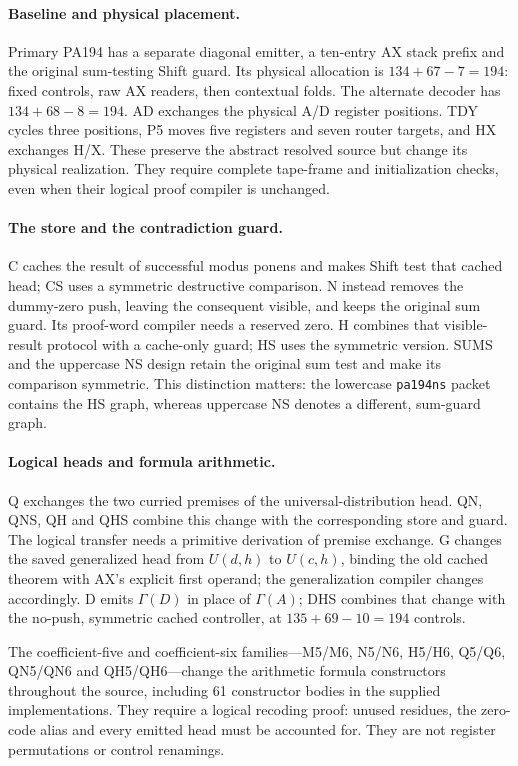 \paragraph{Baseline and physical placement.}
Primary PA194 has a separate diagonal emitter, a ten-entry AX stack
prefix and the original sum-testing Shift guard. Its physical allocation
is $134+67-7=194$: fixed controls, raw AX readers, then contextual folds.
The alternate decoder has $134+68-8=194$. AD exchanges the physical A/D
register positions. TDY cycles three positions, P5 moves five registers
and seven router targets, and HX exchanges H/X. These preserve the
abstract resolved source but change its physical realization. They
require complete tape-frame and initialization checks, even when their
logical proof compiler is unchanged.\cite{pa-readme}

\paragraph{The store and the contradiction guard.}
C caches the result of successful modus ponens and makes Shift test that
cached head; CS uses a symmetric destructive comparison. N instead
removes the dummy-zero push, leaving the consequent visible, and keeps
the original sum guard. Its proof-word compiler needs a reserved zero.
H combines that visible-result protocol with a cache-only guard; HS
uses the symmetric version. SUMS and the uppercase NS design retain
the original sum test and make its comparison symmetric. This distinction
matters: the lowercase \nolinkurl{pa194ns} packet contains the HS graph,
whereas uppercase NS denotes a different, sum-guard graph.

\paragraph{Logical heads and formula arithmetic.}
Q exchanges the two curried premises of the universal-distribution
head. QN, QNS, QH and QHS combine this change with the corresponding
store and guard. The logical transfer needs a primitive derivation of
premise exchange. G changes the saved generalized head from $U(d,h)$ to
$U(c,h)$, binding the old cached theorem with AX's explicit first
operand; the generalization compiler changes accordingly. D emits
$\Gamma(D)$ in place of $\Gamma(A)$; DHS combines that change with the
no-push, symmetric cached controller, at $135+69-10=194$ controls.

The coefficient-five and coefficient-six families---M5/M6, N5/N6,
H5/H6, Q5/Q6, QN5/QN6 and QH5/QH6---change the arithmetic formula
constructors throughout the source, including 61 constructor bodies in
the supplied implementations. They require a logical recoding proof:
unused residues, the zero-code alias and every emitted head must be
accounted for. They are not register permutations or control renamings.

